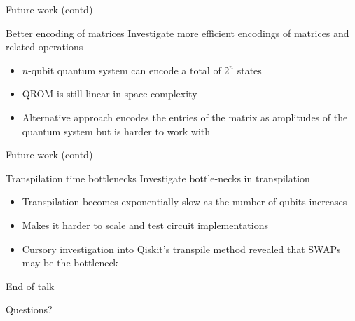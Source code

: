 \documentclass[10pt]{beamer}
\begin{document}
\begin{frame}[t]{Future work (contd)}
  \begin{exampleblock}{Better encoding of matrices}
    Investigate more efficient encodings of matrices and related operations
  \end{exampleblock}

  \begin{itemize}
    \item $n$-qubit quantum system can encode a total of $2^n$ states
    \item QROM is still linear in space complexity
    \item Alternative approach encodes the entries of the matrix as amplitudes
      of the quantum system but is harder to work with
  \end{itemize}
\end{frame}

\begin{frame}[t]{Future work (contd)}
  \begin{exampleblock}{Transpilation time bottlenecks}
    Investigate bottle-necks in transpilation
  \end{exampleblock}
  \begin{itemize}
    \item Transpilation becomes exponentially slow as the number of qubits
      increases
    \item Makes it harder to scale and test circuit implementations
    \item Cursory investigation into Qiskit's transpile method revealed that
      SWAPs may be the bottleneck
  \end{itemize}
\end{frame}

\begin{frame}{End of talk}
  \begin{centering}
    Questions?
  \end{centering}
\end{frame}
\end{document}
